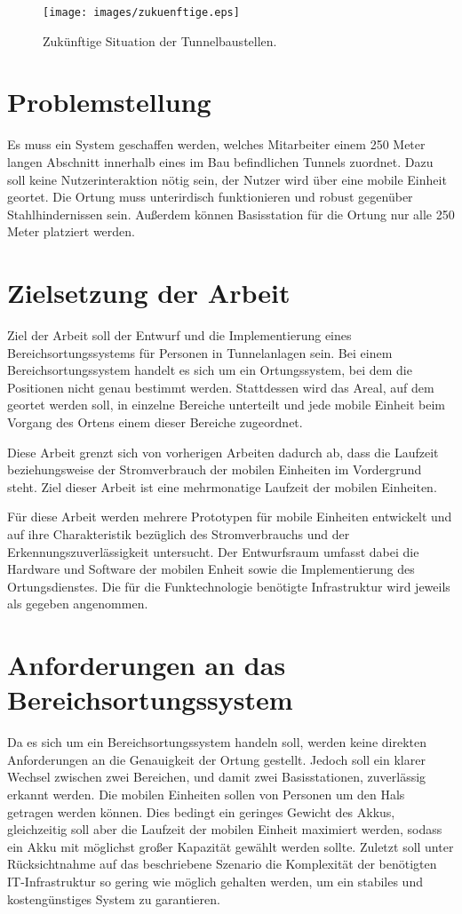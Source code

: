 \begin{figure}[h]
  \centering
	\texttt{[image: images/zukuenftige.eps]}
  \caption{Zukünftige Situation der Tunnelbaustellen.}
  \label{fig:zukuenftige}
\end{figure}

\section{Problemstellung}
Es muss ein System geschaffen werden, welches Mitarbeiter einem 250 Meter langen Abschnitt innerhalb eines im Bau befindlichen Tunnels zuordnet.
Dazu soll keine Nutzerinteraktion nötig sein, der Nutzer wird über eine mobile Einheit geortet.
Die Ortung muss unterirdisch funktionieren und robust gegenüber Stahlhindernissen sein.
Außerdem können Basisstation für die Ortung nur alle 250 Meter platziert werden.


\section{Zielsetzung der Arbeit}
\label{ch:Einleitung:sec:Zielsetzung}
Ziel der Arbeit soll der Entwurf und die Implementierung eines Bereichsortungssystems für Personen in Tunnelanlagen sein. 
Bei einem Bereichsortungssystem handelt es sich um ein Ortungssystem, bei dem die Positionen nicht genau bestimmt werden. 
Stattdessen wird das Areal, auf dem geortet werden soll, in einzelne Bereiche unterteilt und jede mobile Einheit beim Vorgang des Ortens einem dieser Bereiche zugeordnet.

Diese Arbeit grenzt sich von vorherigen Arbeiten dadurch ab, dass die Laufzeit beziehungsweise der Stromverbrauch der mobilen Einheiten im Vordergrund steht. 
Ziel dieser Arbeit ist eine mehrmonatige Laufzeit der mobilen Einheiten. 

Für diese Arbeit werden mehrere Prototypen für mobile Einheiten entwickelt und auf ihre Charakteristik bezüglich des Stromverbrauchs und der Erkennungszuverlässigkeit untersucht.
Der Entwurfsraum umfasst dabei die Hardware und Software der mobilen Enheit sowie die Implementierung des Ortungsdienstes. 
Die für die Funktechnologie benötigte Infrastruktur wird jeweils als gegeben angenommen.


\section{Anforderungen an das Bereichsortungssystem}
\label{ch:Einleitung:sec:Anforderungen}
Da es sich um ein Bereichsortungssystem handeln soll, werden keine direkten Anforderungen an die Genauigkeit der Ortung gestellt. 
Jedoch soll ein klarer Wechsel zwischen zwei Bereichen, und damit zwei Basisstationen, zuverlässig erkannt werden. 
Die mobilen Einheiten sollen von Personen um den Hals getragen werden können. 
Dies bedingt ein geringes Gewicht des Akkus, gleichzeitig soll aber die Laufzeit der mobilen Einheit maximiert werden, sodass ein Akku mit möglichst großer Kapazität gewählt werden sollte.
Zuletzt soll unter Rücksichtnahme auf das beschriebene Szenario die Komplexität der benötigten IT-Infrastruktur so gering wie möglich gehalten werden, um ein stabiles und kostengünstiges System zu garantieren. 


